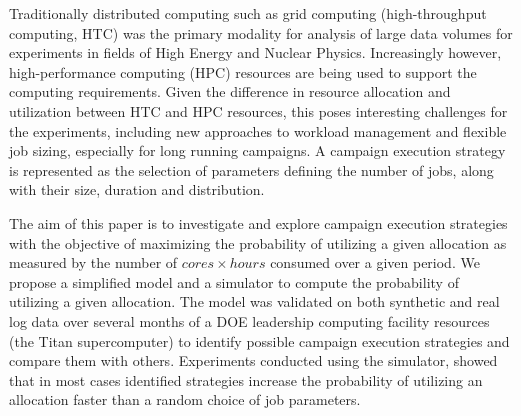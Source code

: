 Traditionally distributed computing such as grid computing (high-throughput
computing, HTC) was the primary modality for analysis of large data volumes
for experiments in fields of High Energy and Nuclear Physics. Increasingly
however, high-performance computing (HPC) resources are being used to support
the computing requirements.
Given the difference in resource allocation and utilization between HTC and
HPC resources, this poses interesting challenges for the experiments,
including new approaches to workload management and flexible job sizing,
especially for long running campaigns.
A campaign execution strategy is represented as the selection of parameters
defining the number of jobs, along with their size, duration and distribution.

The aim of this paper is to investigate and explore campaign execution
strategies with the objective of maximizing the probability of utilizing a
given allocation as measured by the number of $cores \times hours$ consumed
over a given period. We propose a simplified model and a simulator to compute
the probability of utilizing a given allocation. The model was validated on
both synthetic and real log data over several months of a DOE leadership
computing facility resources (the Titan supercomputer) to identify possible
campaign execution strategies and compare them with others.
Experiments conducted using the simulator, showed that in most cases
identified strategies increase the probability of utilizing an allocation
faster than a random choice of job parameters.



